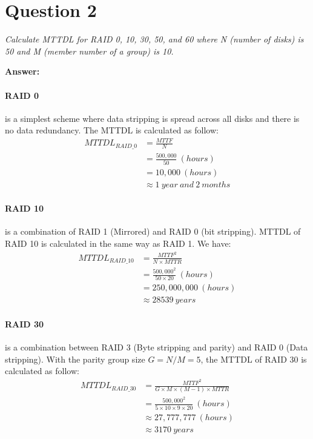 \documentclass[a4paper,11pt]{article}
\begin{document}
\section*{Question 2}

\textit{Calculate MTTDL for RAID 0, 10, 30, 50, and 60 where N (number of disks) is 50 and M (member number of a group) is 10.} 

\noindent
\textbf{Answer:} \\[-3em]
\paragraph{RAID 0} is a simplest scheme where data stripping is spread across all disks and there is no data redundancy. The MTTDL is calculated as follow:
\begin{equation*}
    \begin{aligned}
        MTTDL_{RAID\_0} &= \frac{MTTF}{N} \\
        & = \frac{500,000}{50} \ (hours) \\
        & = 10,000 \ (hours) \\
        & \approx 1\ year\ and\ 2\ months
    \end{aligned}
\end{equation*}
\paragraph{RAID 10} is a combination of RAID 1 (Mirrored) and RAID 0 (bit stripping). MTTDL of RAID 10 is calculated in the same way as RAID 1. We have:
\begin{equation*}
    \begin{aligned}
        MTTDL_{RAID\_10} &= \frac{MTTF^{2}}{N \times MTTR} \\
        & = \frac{500,000^{2}}{50 \times 20} \ (hours) \\ 
        & = 250,000,000 \ (hours) \\
        & \approx 28539 \ years
    \end{aligned}
\end{equation*}
\paragraph{RAID 30} is a combination between RAID 3 (Byte stripping and parity) and RAID 0 (Data stripping). With the parity group size $G=N/M=5$, the MTTDL of RAID 30 is calculated as follow:
\begin{equation*}
    \begin{aligned}
        MTTDL_{RAID\_30} &= \frac{MTTF^{2}}{G \times M \times (M-1) \times MTTR} \\
        & = \frac{500,000^{2}}{5 \times 10 \times 9 \times 20} \ (hours) \\ 
        & \approx 27,777,777 \ (hours) \\
        & \approx 3170 \ years
    \end{aligned}
\end{equation*}
\end{document}
